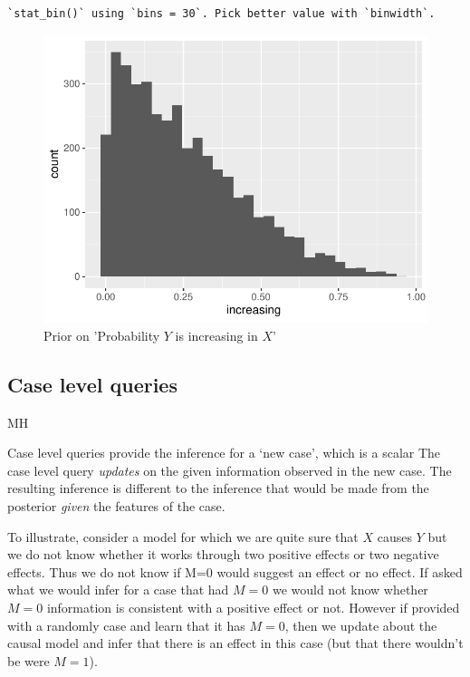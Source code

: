 \documentclass[
  article]{jss}
\begin{document}
\begin{verbatim}
`stat_bin()` using `bins = 30`. Pick better value with `binwidth`.
\end{verbatim}

\begin{figure}[H]

{\centering \includegraphics{paper_files/figure-pdf/unnamed-chunk-92-1.pdf}

}

\caption{Prior on 'Probability \(Y\) is increasing in \(X\)'}

\end{figure}

\hypertarget{case-level-queries}{%
\subsection{Case level queries}\label{case-level-queries}}

MH

Case level queries provide the inference for a `new case', which is a
scalar The case level query \emph{updates} on the given information
observed in the new case. The resulting inference is different to the
inference that would be made from the posterior \emph{given} the
features of the case.

To illustrate, consider a model for which we are quite sure that \(X\)
causes \(Y\) but we do not know whether it works through two positive
effects or two negative effects. Thus we do not know if M=0 would
suggest an effect or no effect. If asked what we would infer for a case
that had \(M=0\) we would not know whether \(M=0\) information is
consistent with a positive effect or not. However if provided with a
randomly case and learn that it has \(M=0\), then we update about the
causal model and infer that there is an effect in this case (but that
there wouldn't be were \(M=1\)).
\end{document}
